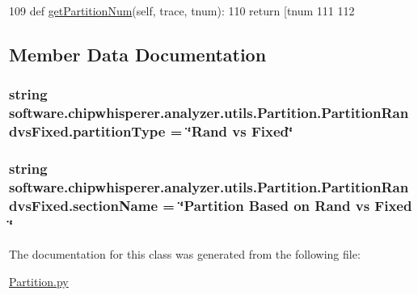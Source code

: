 \begin{DoxyCode}
109     \textcolor{keyword}{def }\hyperlink{classsoftware_1_1chipwhisperer_1_1analyzer_1_1utils_1_1Partition_1_1PartitionRandvsFixed_a1401bae6c6fe6c232e1a9d4c976125ea}{getPartitionNum}(self, trace, tnum):
110         \textcolor{keywordflow}{return} [tnum %
111 
112 
\end{DoxyCode}


\subsection{Member Data Documentation}
\hypertarget{classsoftware_1_1chipwhisperer_1_1analyzer_1_1utils_1_1Partition_1_1PartitionRandvsFixed_a95113ddd5393bc7dbd414d9f842354a0}{}
\subsubsection[{partition\+Type}]{\setlength{\rightskip}{0pt plus 5cm}string software.\+chipwhisperer.\+analyzer.\+utils.\+Partition.\+Partition\+Randvs\+Fixed.\+partition\+Type = \char`\"{}Rand vs Fixed\char`\"{}\hspace{0.3cm}{\ttfamily [static]}}\label{classsoftware_1_1chipwhisperer_1_1analyzer_1_1utils_1_1Partition_1_1PartitionRandvsFixed_a95113ddd5393bc7dbd414d9f842354a0}
\hypertarget{classsoftware_1_1chipwhisperer_1_1analyzer_1_1utils_1_1Partition_1_1PartitionRandvsFixed_ae6913b45945d0067d3278c2dd3d35af2}{}
\subsubsection[{section\+Name}]{\setlength{\rightskip}{0pt plus 5cm}string software.\+chipwhisperer.\+analyzer.\+utils.\+Partition.\+Partition\+Randvs\+Fixed.\+section\+Name = \char`\"{}Partition Based on Rand vs Fixed \char`\"{}\hspace{0.3cm}{\ttfamily [static]}}\label{classsoftware_1_1chipwhisperer_1_1analyzer_1_1utils_1_1Partition_1_1PartitionRandvsFixed_ae6913b45945d0067d3278c2dd3d35af2}


The documentation for this class was generated from the following file\+:\begin{DoxyCompactItemize}
\item 
\hyperlink{Partition_8py}{Partition.\+py}\end{DoxyCompactItemize}
